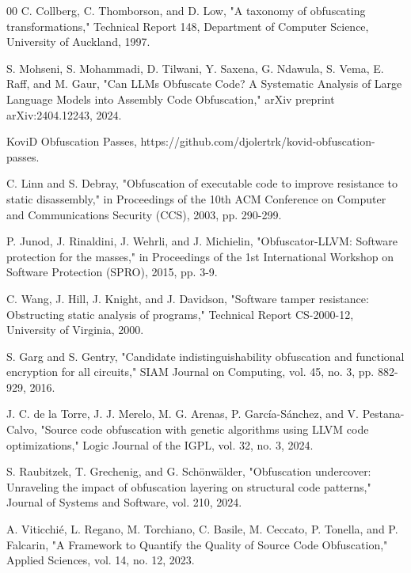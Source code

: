 \documentclass[conference]{IEEEtran}
\begin{document}
\begin{thebibliography}{00}
 C. Collberg, C. Thomborson, and D. Low, "A taxonomy of obfuscating transformations," Technical Report 148, Department of Computer Science, University of Auckland, 1997.

 S. Mohseni, S. Mohammadi, D. Tilwani, Y. Saxena, G. Ndawula, S. Vema, E. Raff, and M. Gaur, "Can LLMs Obfuscate Code? A Systematic Analysis of Large Language Models into Assembly Code Obfuscation," arXiv preprint arXiv:2404.12243, 2024.

 KoviD Obfuscation Passes, https://github.com/djolertrk/kovid-obfuscation-passes.

 C. Linn and S. Debray, "Obfuscation of executable code to improve resistance to static disassembly," in Proceedings of the 10th ACM Conference on Computer and Communications Security (CCS), 2003, pp. 290-299.

 P. Junod, J. Rinaldini, J. Wehrli, and J. Michielin, "Obfuscator-LLVM: Software protection for the masses," in Proceedings of the 1st International Workshop on Software Protection (SPRO), 2015, pp. 3-9.

 C. Wang, J. Hill, J. Knight, and J. Davidson, "Software tamper resistance: Obstructing static analysis of programs," Technical Report CS-2000-12, University of Virginia, 2000.

 S. Garg and S. Gentry, "Candidate indistinguishability obfuscation and functional encryption for all circuits," SIAM Journal on Computing, vol. 45, no. 3, pp. 882-929, 2016.

 J. C. de la Torre, J. J. Merelo, M. G. Arenas, P. García-Sánchez, and V. Pestana-Calvo, "Source code obfuscation with genetic algorithms using LLVM code optimizations," Logic Journal of the IGPL, vol. 32, no. 3, 2024.

 S. Raubitzek, T. Grechenig, and G. Schönwälder, "Obfuscation undercover: Unraveling the impact of obfuscation layering on structural code patterns," Journal of Systems and Software, vol. 210, 2024.

 A. Viticchié, L. Regano, M. Torchiano, C. Basile, M. Ceccato, P. Tonella, and P. Falcarin, "A Framework to Quantify the Quality of Source Code Obfuscation," Applied Sciences, vol. 14, no. 12, 2023.


\end{thebibliography}
\end{document}
